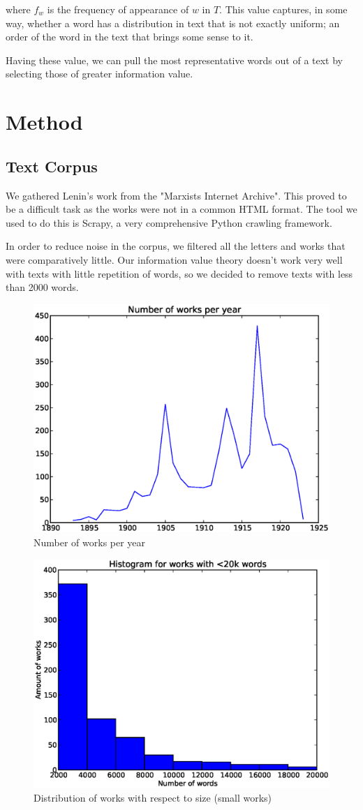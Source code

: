 \documentclass{pnastwo}
\begin{document}
\begin{article}
where $f_w$ is the frequency of appearance of $w$ in $T$. This value captures, in some way, whether a word
has a distribution in text that is not exactly uniform; an order of the word in the text that brings some sense to it.

Having these value, we can pull the most representative words out of a text by selecting those of greater information value.

\section{Method}
\subsection{Text Corpus}
We gathered Lenin's work from the "Marxists Internet Archive". This proved to be a difficult task as the works were not in a common HTML format. The tool we used to do this is Scrapy, a very comprehensive Python crawling framework.

In order to reduce noise in the corpus, we filtered all the letters and works that were comparatively little. Our information value theory doesn't work very well with texts with little repetition of words, so we decided to remove texts with less than 2000 words. 

\begin{figure}
\centerline{\includegraphics[width=.4\textwidth]{figures/tokens_per_year.eps}}
\caption{Number of works per year}\label{afoto}
\end{figure}

\begin{figure}
\centerline{\includegraphics[width=.4\textwidth]{figures/hist_tokens_small_works.eps}}
\caption{Distribution of works with respect to size (small works)}\label{afoto}
\end{figure}



\end{article}
\end{document}
